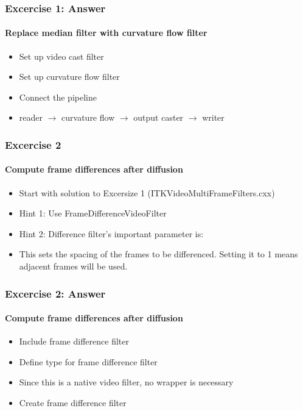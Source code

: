 {
\begin{frame}[fragile]
\frametitle{Excercise 1: Answer}
\framesubtitle{Replace median filter with curvature flow filter}
\begin{itemize}
\item Set up video cast filter
\pause

\item Set up curvature flow filter
\pause

\item Connect the pipeline
\item reader $\rightarrow$ curvature
  flow $\rightarrow$ output caster $\rightarrow$ writer
\end{itemize}
\end{frame}
}


{
\begin{frame}[fragile]
\frametitle{Excercise 2}
\framesubtitle{Compute frame differences after diffusion}
\begin{itemize}
\item Start with solution to Excersize 1 (ITKVideoMultiFrameFilters.cxx)
\pause

\item Hint 1: Use FrameDifferenceVideoFilter
\pause

\item Hint 2: Difference filter's important parameter is:
\item This sets the spacing of the frames to be differenced. Setting
  it to 1 means adjacent frames will be used.
\end{itemize}
\end{frame}
}

{
\begin{frame}[fragile]
\frametitle{Excercise 2: Answer}
\framesubtitle{Compute frame differences after diffusion}
\begin{itemize}
\item Include frame difference filter
\pause

\item Define type for frame difference filter
\item Since this is a native video filter, no wrapper is necessary
\pause

\item Create frame difference filter
\end{itemize}
\end{frame}
}

